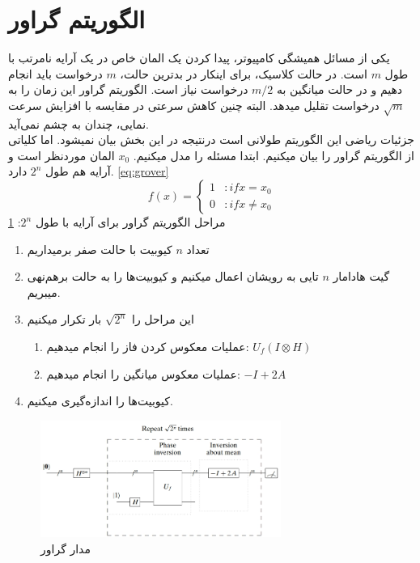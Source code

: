 \section{الگوریتم گراور}
یکی از مسائل همیشگی کامپیوتر، پیدا کردن یک المان خاص در یک آرایه نامرتب با طول $m$ است. در حالت کلاسیک، برای اینکار در بدترین حالت، $m$ درخواست باید انجام دهیم و در حالت میانگین به $m/2$ درخواست نیاز است. الگوریتم گراور
این زمان را به $\sqrt{m}$ درخواست تقلیل میدهد. البته چنین کاهش سرعتی در مقایسه با افزایش سرعت نمایی، چندان به چشم نمی‌آید. 
\\
جزئیات ریاضی این الگوریتم طولانی است درنتیجه در این بخش بیان نمیشود. اما کلیاتی از الگوریتم گراور را بیان میکنیم. ابتدا مسئله را مدل میکنیم. $x_{0}$ المان موردنظر است و آرایه هم طول $2^{n}$ دارد.
\ref{eq:grover}
\begin{equation} \label{eq:grover}
f(x) = \left\{ \begin{array}{cl}
1 & : if x = x_{0}  \\
0 & : if x \neq x_{0}
\end{array} \right.
\end{equation}
مراحل الگوریتم گراور برای آرایه با طول $2^{n}$:
\ref{fig:grovercircuit}
\begin{enumerate}
\item
تعداد $n$ کیوبیت با حالت صفر برمیداریم
\item
گیت هادامار $n$ تایی به رویشان اعمال میکنیم و کیوبیت‌ها را به حالت برهم‌نهی میبریم. 
\item
این مراحل را $\sqrt{2^{n}}$ بار تکرار میکنیم

\begin{enumerate}
\item
عملیات معکوس کردن فاز را انجام میدهیم: 
$U_{f}(I \otimes H)$
\item
عملیات معکوس میانگین را انجام میدهیم:
$ -I + 2A$
\end{enumerate}
\item
کیوبیت‌ها را اندازه‌گیری میکنیم.
\end{enumerate}
\begin{figure}
\centerline{\includegraphics[width=0.7\textwidth]{grovercircuit.jpeg}}
\caption{مدار گراور}
\label{fig:grovercircuit}
\end{figure}
\cite{cambridgebook}
